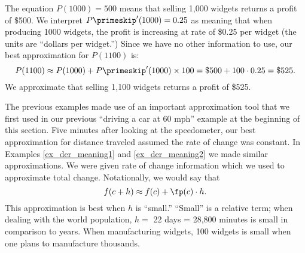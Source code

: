 {The equation $P(1000)=500$ means that selling 1,000 widgets returns a profit of \$500. We interpret $P\primeskip'(1000) = 0.25$ as meaning that when producing 1000 widgets, the profit is increasing at rate of \$0.25 per widget (the units are ``dollars per widget.'') Since we have no other information to use, our best approximation for $P(1100)$ is:
\[P(1100)\approx P(1000)+P\primeskip'(1000)\times100=\$500+100\cdot0.25=\$525.\]
We approximate that selling 1,100 widgets returns a profit of \$525.}

The previous examples made use of an important approximation tool that we first used in our previous ``driving a car at 60 mph'' example at the beginning of this section. Five minutes after looking at the speedometer, our best approximation for distance traveled assumed the rate of change was constant. In Examples \ref{ex_der_meaning1} and \ref{ex_der_meaning2} we made similar approximations. We were given rate of change information which we used to approximate total change. Notationally, we would say that 
\[f(c+h) \approx f(c) + \fp(c)\cdot h.\]
This approximation is best when $h$ is ``small.'' ``Small'' is a relative term; when dealing with the world population, $h=$ 22 days = 28,800 minutes is small in comparison to years. When manufacturing widgets, 100 widgets is small when one plans to manufacture thousands.


